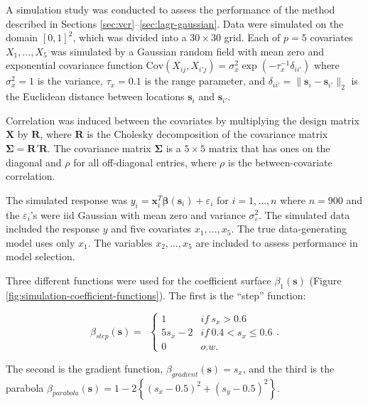 \documentclass[authoryear,review, 12pt]{elsarticle}
\begin{document}
A simulation study was conducted to assess the performance of the
method described in Sections \ref{sec:vcr}--\ref{sec:lagr-gaussian}.
Data were simulated on the domain $[0,1]^{2}$, which was divided
into a $30\times30$ grid. Each of $p=5$ covariates $X_{1},\dots,X_{5}$
was simulated by a Gaussian random field with mean zero and exponential
covariance function $\text{Cov}\left(X_{ij},X_{i'j}\right)=\sigma_{x}^{2}\exp{\left(-\tau_{x}^{-1}\delta_{ii'}\right)}$
where $\sigma_{x}^{2}=1$ is the variance, $\tau_{x}=0.1$ is the
range parameter, and $\delta_{ii'}=\|\bm{s}_{i}-\bm{s}_{i'}\|_{2}$
is the Euclidean distance between locations $\bm{s}_{i}$ and $\bm{s}_{i'}$. 

Correlation was induced between the covariates by multiplying the
design matrix $\bm{X}$ by $\bm{R}$, where $\bm{R}$ is the Cholesky
decomposition of the covariance matrix $\bm{\Sigma}=\bm{R}'\bm{R}$.
The covariance matrix $\bm{\Sigma}$ is a $5\times5$ matrix that
has ones on the diagonal and $\rho$ for all off-diagonal entries,
where $\rho$ is the between-covariate correlation. 

The simulated response was $y_{i}=\bm{x}_{i}^{T}\bm{\beta}\left(\bm{s}_{i}\right)+\varepsilon_{i}$
for $i=1,\dots,n$ where $n=900$ and the $\varepsilon_{i}$'s were
iid Gaussian with mean zero and variance $\sigma_{\varepsilon}^{2}$.
The simulated data included the response $y$ and five covariates
$x_{1},\dots,x_{5}$. The true data-generating model uses only $x_{1}$.
The variables $x_{2},\dots,x_{5}$ are included to assess performance
in model selection. 

Three different functions were used for the coefficient surface $\beta_{1}(\bm{s})$
(Figure \ref{fig:simulation-coefficient-functions}). The first is
the ``step'' function:

\[
\beta_{step}(\bm{s})=\ \ \begin{cases}
1 & if\ s_{x}>0.6\\
5s_{x}-2 & if\ 0.4<s_{x}\le0.6\\
0 & o.w.
\end{cases}.
\]


The second is the gradient function, $\beta_{gradient}(\bm{s})=s_{x}$,
and the third is the parabola $\beta_{parabola}(\bm{s})=1-2\left\{ (s_{x}-0.5)^{2}+(s_{y}-0.5)^{2}\right\} $.
\end{document}
